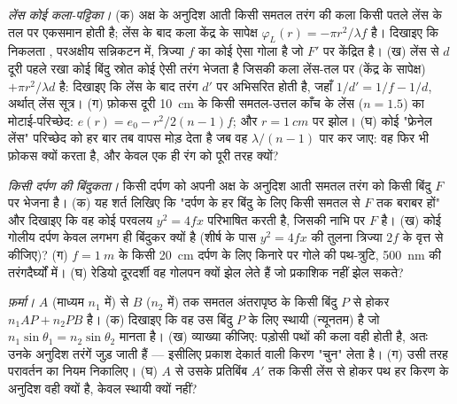 \begin{exercise}[$\star\star$]\label{exo:b2:scalar-light-model:5}
\emph{लेंस कोई कला-पट्टिका।} (क) अक्ष के अनुदिश आती किसी समतल तरंग की
कला किसी पतले लेंस के तल पर एकसमान होती है; लेंस के बाद कला
केंद्र के सापेक्ष $\varphi_L(r) = -\pi r^2/\lambda f$ है। दिखाइए कि निकलता
, परअक्षीय सन्निकटन में, त्रिज्या $f$ का कोई ऐसा गोला है जो
$F'$ पर केंद्रित है। (ख) लेंस से $d$ दूरी पहले रखा कोई बिंदु स्रोत
कोई ऐसी तरंग भेजता है जिसकी कला लेंस-तल पर (केंद्र के सापेक्ष) $+\pi r^2/\lambda d$ है:
दिखाइए कि लेंस के बाद तरंग $d'$ पर अभिसरित होती है, जहाँ
$1/d' = 1/f - 1/d$, अर्थात् लेंस सूत्र। (ग) फ़ोकस दूरी \qty{10}{cm} के किसी
समतल-उत्तल काँच के लेंस ($n = 1.5$) का मोटाई-परिच्छेद: $e(r) =
e_0 - r^2/2(n - 1)f$; और $r = \qty{1}{cm}$ पर झोल। (घ) कोई "फ्रेनेल लेंस" परिच्छेद को
हर बार तब वापस मोड़ देता है जब वह $\lambda/(n - 1)$ पार कर जाए: वह फिर भी
फ़ोकस क्यों करता है, और केवल एक ही रंग को पूरी तरह क्यों?
\end{exercise}

\begin{exercise}[$\star\star$]\label{exo:b2:scalar-light-model:6}
\emph{किसी दर्पण की बिंदुकता।} किसी दर्पण को अपनी अक्ष के अनुदिश आती
समतल तरंग को किसी बिंदु $F$ पर भेजना है। (क) यह शर्त लिखिए कि "दर्पण के हर
बिंदु के लिए किसी समतल  से $F$ तक  बराबर हों" और
दिखाइए कि वह कोई परवलय $y^2 = 4fx$ परिभाषित करती है, जिसकी नाभि पर $F$ है। (ख) कोई
गोलीय दर्पण केवल लगभग ही बिंदुकर क्यों है (शीर्ष के पास $y^2 = 4fx$ की तुलना
त्रिज्या $2f$ के वृत्त से कीजिए)? (ग) $f = \qty{1}{m}$ के किसी \qty{20}{cm} दर्पण
के लिए किनारे पर गोले की पथ-त्रुटि, \qty{500}{nm} की
तरंगदैर्घ्यों में। (घ) रेडियो दूरदर्शी वह गोलपन क्यों झेल लेते हैं
जो प्रकाशिक नहीं झेल सकते?
\end{exercise}

\begin{exercise}[$\star\star$]\label{exo:b2:scalar-light-model:7}
\emph{फ़र्मा।} $A$ (माध्यम $n_1$ में) से $B$ ($n_2$ में) तक समतल अंतरापृष्ठ के
किसी बिंदु $P$ से होकर  $n_1AP + n_2PB$ है। (क)
दिखाइए कि वह उस बिंदु $P$ के लिए स्थायी (न्यूनतम) है जो
$n_1\sin\theta_1 = n_2\sin\theta_2$ मानता है। (ख) व्याख्या कीजिए: पड़ोसी पथों की कला
वही होती है, अतः उनके अनुदिश तरंगें जुड़ जाती हैं --- इसीलिए प्रकाश
देकार्त वाली किरण "चुन" लेता है। (ग) उसी तरह परावर्तन का नियम
निकालिए। (घ) $A$ से उसके प्रतिबिंब $A'$ तक किसी लेंस से होकर पथ हर किरण के
अनुदिश वही क्यों है, केवल स्थायी क्यों नहीं?
\end{exercise}

